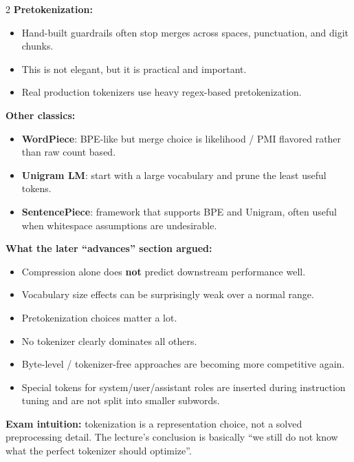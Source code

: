 \documentclass[10pt]{article}
\begin{document}
\begin{multicols*}{2}
\textbf{Pretokenization:}
\begin{itemize}
\item Hand-built guardrails often stop merges across spaces, punctuation, and digit chunks.
\item This is not elegant, but it is practical and important.
\item Real production tokenizers use heavy regex-based pretokenization.
\end{itemize}

\textbf{Other classics:}
\begin{itemize}
\item \textbf{WordPiece}: BPE-like but merge choice is likelihood / PMI flavored rather than raw count based.
\item \textbf{Unigram LM}: start with a large vocabulary and prune the least useful tokens.
\item \textbf{SentencePiece}: framework that supports BPE and Unigram, often useful when whitespace assumptions are undesirable.
\end{itemize}

\textbf{What the later ``advances'' section argued:}
\begin{itemize}
\item Compression alone does \textbf{not} predict downstream performance well.
\item Vocabulary size effects can be surprisingly weak over a normal range.
\item Pretokenization choices matter a lot.
\item No tokenizer clearly dominates all others.
\item Byte-level / tokenizer-free approaches are becoming more competitive again.
\item Special tokens for system/user/assistant roles are inserted during instruction tuning and are not split into smaller subwords.
\end{itemize}

\textbf{Exam intuition:} tokenization is a representation choice, not a solved preprocessing detail. The lecture's conclusion is basically ``we still do not know what the perfect tokenizer should optimize''.


\end{multicols*}
\end{document}

